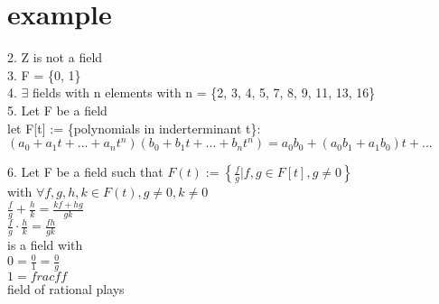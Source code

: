 \documentclass[11pt]{article}
\begin{document}
\section{example}
2. Z is not a field\\

3. F = \{0, 1\}\\

4. $\exists$ fields with n elements with n = \{2, 3, 4, 5, 7, 8, 9, 11, 13, 16\}\\

5. Let F be a field \\
let F[t] := \{polynomials in inderterminant t\}:\\
$(a_0+a_1t+...+a_nt^n)(b_0+b_1t+...+b_nt^n) = a_0b_0+(a_0b_1+a_1b_0)t+...$

6. Let F be a field such that $F(t) := \left\{\frac{f}{g}| f,g\in F[t], g\neq 0\right\}$\\
with $\forall f,g,h,k \in F(t), g \neq 0, k \neq 0$\\
$\frac{f}{g}+\frac{h}{k}=\frac{kf+hg}{gk}$\\
$\frac{f}{g}\cdot \frac{h}{k}=\frac{fh}{gk}$\\
is a field with\\
$0=\frac{0}{1}=\frac{0}{g}$\\
$1=frac{f}{f}$\\
field of rational plays\\
\end{document}
